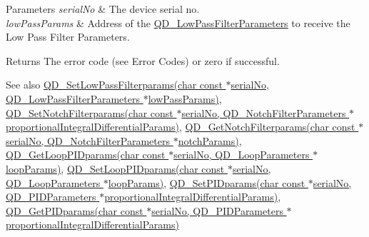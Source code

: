 \begin{DoxyParams}{Parameters}
{\em serial\+No} & The device serial no. \\
\hline
{\em low\+Pass\+Params} & Address of the \hyperlink{struct_q_d___low_pass_filter_parameters}{Q\+D\+\_\+\+Low\+Pass\+Filter\+Parameters} to receive the Low Pass Filter Parameters. \\
\hline
\end{DoxyParams}
\begin{DoxyReturn}{Returns}
The error code (see Error Codes) or zero if successful. 
\end{DoxyReturn}
\begin{DoxySeeAlso}{See also}
\hyperlink{group___t_cube_quad_ga2e8b2f659d9008af335d876976450bc5}{Q\+D\+\_\+\+Set\+Low\+Pass\+Filterparams(char const $\ast$serial\+No, Q\+D\+\_\+\+Low\+Pass\+Filter\+Parameters $\ast$low\+Pass\+Params)}, \hyperlink{group___t_cube_quad_ga00572c166108d5bd60ed0ab5eae7d83c}{Q\+D\+\_\+\+Set\+Notch\+Filterparams(char const $\ast$serial\+No, Q\+D\+\_\+\+Notch\+Filter\+Parameters $\ast$proportional\+Integral\+Differential\+Params)}, \hyperlink{group___t_cube_quad_ga5132ce023e2c0248a42cb5cdf0a95c3e}{Q\+D\+\_\+\+Get\+Notch\+Filterparams(char const $\ast$serial\+No, Q\+D\+\_\+\+Notch\+Filter\+Parameters $\ast$notch\+Params)}, \hyperlink{group___t_cube_quad_ga9dfc01ca4b37b2f0c662b8d8def06e73}{Q\+D\+\_\+\+Get\+Loop\+P\+I\+Dparams(char const $\ast$serial\+No, Q\+D\+\_\+\+Loop\+Parameters $\ast$loop\+Params)}, \hyperlink{group___t_cube_quad_gad75ed2cff04b2d218326841b2553af0a}{Q\+D\+\_\+\+Set\+Loop\+P\+I\+Dparams(char const $\ast$serial\+No, Q\+D\+\_\+\+Loop\+Parameters $\ast$loop\+Params)}, \hyperlink{group___t_cube_quad_gac4cc242d12537c25f48b86e73138c3d1}{Q\+D\+\_\+\+Set\+P\+I\+Dparams(char const $\ast$serial\+No, Q\+D\+\_\+\+P\+I\+D\+Parameters $\ast$proportional\+Integral\+Differential\+Params)}, \hyperlink{group___t_cube_quad_ga2e1be6be7d8bb5c822766a44205889ae}{Q\+D\+\_\+\+Get\+P\+I\+Dparams(char const $\ast$serial\+No, Q\+D\+\_\+\+P\+I\+D\+Parameters $\ast$proportional\+Integral\+Differential\+Params)}


\end{DoxySeeAlso}
